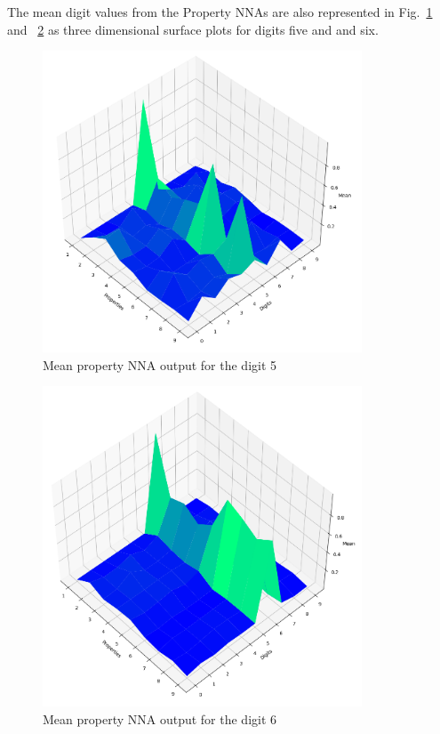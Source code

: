\documentclass[conference]{IEEEtran}
\begin{document}
The mean digit values from the Property NNAs are also represented  in Fig.~\ref{digit5votes} and ~\ref{digit6votes} as three dimensional surface plots for digits five and  and six.

\begin{figure}[htbp]
\centerline{\includegraphics[width=95mm]{./images/digit-5.png}}
\caption{Mean property NNA output for the digit 5}
\label{digit5votes}
\end{figure}

\begin{figure}[htbp]
\centerline{\includegraphics[width=95mm]{./images/digit-6.png}}
\caption{Mean property NNA output for the digit 6}
\label{digit6votes}
\end{figure}
\end{document}
